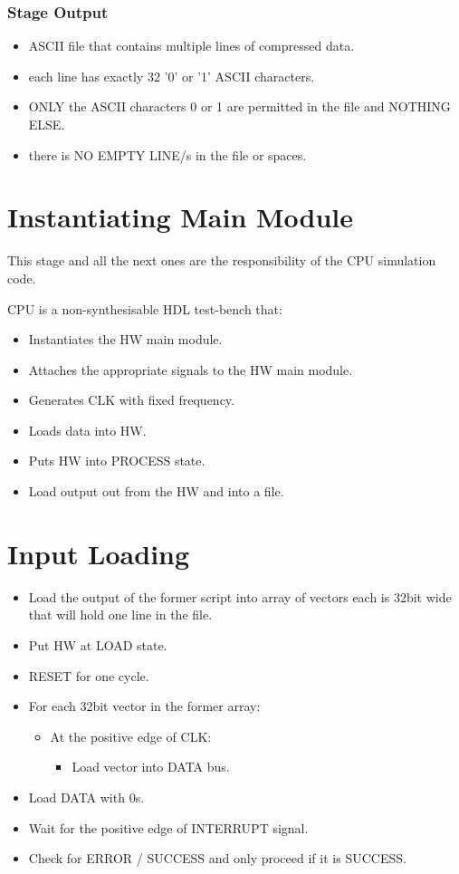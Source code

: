 \documentclass[12pt]{report}
\begin{document}
\subsubsection{Stage Output}
\begin{itemize}
    \item ASCII file that contains multiple lines of compressed data.
    \item each line has exactly 32 '0' or '1' ASCII characters.
    \item ONLY the ASCII characters 0 or 1 are permitted in the file and NOTHING ELSE.
    \item there is NO EMPTY LINE/s in the file or spaces.
\end{itemize}

\section{Instantiating Main Module}
This stage and all the next ones are the responsibility of the CPU simulation code.

CPU is a non-synthesisable HDL test-bench that:
\begin{itemize}
    \item Instantiates the HW main module.
    \item Attaches the appropriate signals to the HW main module.
    \item Generates CLK with fixed frequency.
    \item Loads data into HW.
    \item Puts HW into PROCESS state.
    \item Load output out from the HW and into a file.
\end{itemize}

\section{Input Loading}
\begin{itemize}
    \item Load the output of the former script into array of vectors each is 32bit wide that will hold one line in the file.
    \item Put HW at LOAD state.
    \item RESET for one cycle.
    \item For each 32bit vector in the former array:
    \begin{itemize}
        \item At the positive edge of CLK:
        \begin{itemize}
            \item Load vector into DATA bus.
        \end{itemize}
    \end{itemize}
    \item Load DATA with 0s.
    \item Wait for the positive edge of INTERRUPT signal.
    \item Check for ERROR / SUCCESS and only proceed if it is SUCCESS.
\end{itemize}
\end{document}
